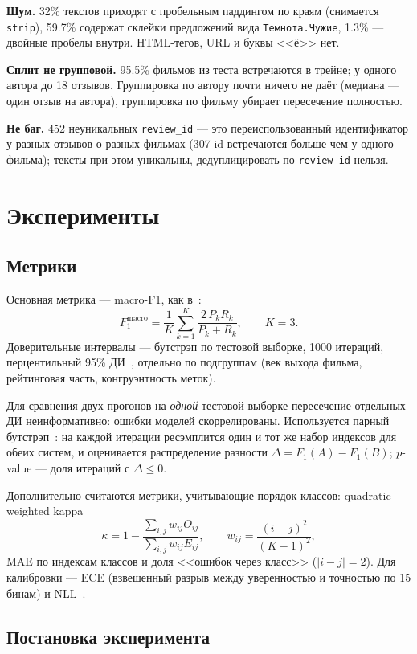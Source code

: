\documentclass{article}
\begin{document}
\textbf{Шум.} 32\% текстов приходят с пробельным паддингом по краям (снимается
\texttt{strip}), 59.7\% содержат склейки предложений вида \texttt{Темнота.Чужие},
1.3\% --- двойные пробелы внутри. HTML-тегов, URL и буквы <<ё>> нет.

\textbf{Сплит не групповой.} 95.5\% фильмов из теста встречаются в трейне; у одного
автора до 18 отзывов. Группировка по автору почти ничего не даёт (медиана --- один
отзыв на автора), группировка по фильму убирает пересечение полностью.

\textbf{Не баг.} 452 неуникальных \texttt{review\_id} --- это переиспользованный
идентификатор у разных отзывов о разных фильмах (307 id встречаются больше чем
у одного фильма); тексты при этом уникальны, дедуплицировать по \texttt{review\_id} нельзя.

\section{Эксперименты}

\subsection{Метрики}

Основная метрика --- macro-F1, как в~\cite{serbina2026argument}:
$$F_1^{\text{macro}} = \frac{1}{K}\sum_{k=1}^{K} \frac{2\,P_k R_k}{P_k + R_k},
\qquad K = 3.$$
Доверительные интервалы --- бутстрэп по тестовой выборке, 1000 итераций,
перцентильный 95\% ДИ~\cite{efron1993introduction}, отдельно по подгруппам
(век выхода фильма, рейтинговая часть, конгруэнтность меток).

Для сравнения двух прогонов на \emph{одной} тестовой выборке пересечение отдельных ДИ
неинформативно: ошибки моделей скоррелированы. Используется парный
бутстрэп~\cite{koehn2004statistical}: на каждой итерации ресэмплится один и тот же набор
индексов для обеих систем, и оценивается распределение разности
$\Delta = F_1(A) - F_1(B)$; $p$-value --- доля итераций с $\Delta \le 0$.

Дополнительно считаются метрики, учитывающие порядок классов:
quadratic weighted kappa~\cite{cohen1968weighted}
$$\kappa = 1 - \frac{\sum_{i,j} w_{ij} O_{ij}}{\sum_{i,j} w_{ij} E_{ij}},
\qquad w_{ij} = \frac{(i-j)^2}{(K-1)^2},$$
MAE по индексам классов и доля <<ошибок через класс>> ($|i - j| = 2$).
Для калибровки --- ECE (взвешенный разрыв между уверенностью и точностью по 15 бинам)
и NLL~\cite{guo2017calibration}.

\subsection{Постановка эксперимента}
\end{document}
